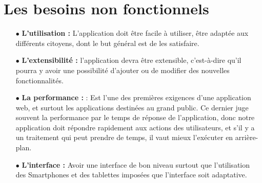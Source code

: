  \section{ Les besoins non fonctionnels}
\begin{itemize}


\item[$\bullet$] \textbf{L'utilisation :}  L'application doit être facile à utiliser, être adaptée aux différents citoyens,  dont le but général est de les satisfaire.\\


\item[$\bullet$]\textbf{L’extensibilité :} l’application devra être extensible, c’est-à-dire qu’il pourra y avoir une possibilité d’ajouter ou de modifier des nouvelles fonctionnalités. \\

\item[$\bullet$] \textbf{La performance : }: Est l'une des premières exigences d'une application
web, et surtout les applications destinées au grand public. Ce dernier juge souvent
la performance par le temps de réponse de l'application, donc notre application doit
répondre rapidement aux actions des utilisateurs, et s'il y a un traitement qui peut
prendre de temps, il vaut mieux l'exécuter en arrière-plan.
\\

\item[$\bullet$] \textbf{L’interface :} Avoir une interface de bon niveau surtout que l’utilisation des Smartphones et des tablettes imposées que l’interface soit adaptative. \\





\end{itemize}



